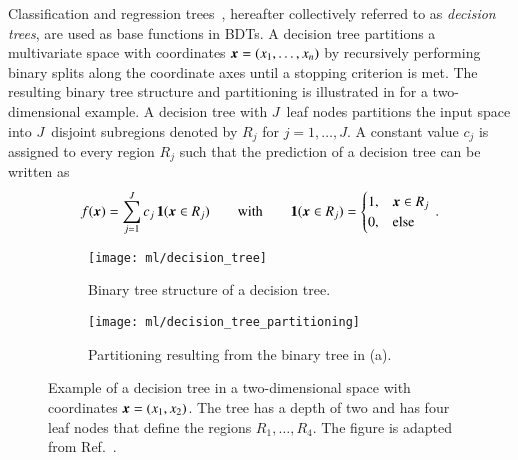 Classification and regression trees~\cite{Breiman:1984jka,hastie09}, hereafter
collectively referred to as \emph{decision trees}, are used as base functions in
BDTs. A decision tree partitions a multivariate space with coordinates
$\myvec{x} = (x_1, \dots, x_n)$ by recursively performing binary splits along
the coordinate axes until a stopping criterion is met. The resulting binary tree
structure and partitioning is illustrated in  for a
two-dimensional example. A decision tree with $J$~leaf nodes partitions the
input space into $J$~disjoint subregions denoted by $R_j$ for $j = 1, \dots,
J$. A constant value $c_j$ is assigned to every region $R_j$ such that the
prediction of a decision tree can be written as~\cite{hastie09}
\begin{align*}
  f(\myvec{x}) = \sum_{j = 1}^{J} c_j \, \mathbf{1}(\myvec{x} \in R_j) \qquad \text{with} \qquad \mathbf{1}(\myvec{x} \in R_j) =
  \begin{cases}
    1, & \myvec{x} \in R_j \\
    0, & \text{else}
  \end{cases} \,\text{.}
\end{align*}

\begin{figure}[htbp]
  \centering

  \begin{subfigure}[b]{0.46\textwidth}
    \centering
    \texttt{[image: ml/decision\_tree]}
    \caption{Binary tree structure of a decision tree.}
  \end{subfigure}\hfill%
  \begin{subfigure}[b]{0.46\textwidth}
    \centering
    \texttt{[image: ml/decision\_tree\_partitioning]}
    \vspace*{0.7em}
    \caption{Partitioning resulting from the binary tree in (a).}
  \end{subfigure}\hfill%

  \caption{Example of a decision tree in a two-dimensional space with
    coordinates $\myvec{x} = (x_1, x_2)$. The tree has a depth of two and has
    four leaf nodes that define the regions $R_1, \dots, R_4$. The figure is
    adapted from Ref.~\cite{hastie09}.}%
  \label{fig:decision_tree}
\end{figure}

